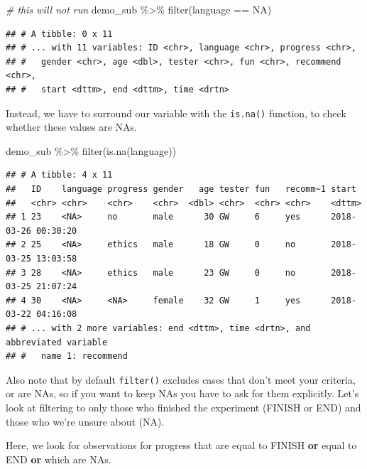 \documentclass[
]{book}
\newenvironment{Shaded}{\begin{snugshade}}{\end{snugshade}}
\newcommand{\CommentTok}[1]{\textcolor[rgb]{0.56,0.35,0.01}{\textit{#1}}}
\newcommand{\ConstantTok}[1]{\textcolor[rgb]{0.00,0.00,0.00}{#1}}
\newcommand{\FunctionTok}[1]{\textcolor[rgb]{0.00,0.00,0.00}{#1}}
\newcommand{\NormalTok}[1]{#1}
\newcommand{\SpecialCharTok}[1]{\textcolor[rgb]{0.00,0.00,0.00}{#1}}
\begin{document}
\begin{Shaded}
\begin{Highlighting}[]
\CommentTok{\# this will not run}
\NormalTok{demo\_sub }\SpecialCharTok{\%\textgreater{}\%} \FunctionTok{filter}\NormalTok{(language }\SpecialCharTok{==} \ConstantTok{NA}\NormalTok{)}
\end{Highlighting}
\end{Shaded}

\begin{verbatim}
## # A tibble: 0 x 11
## # ... with 11 variables: ID <chr>, language <chr>, progress <chr>,
## #   gender <chr>, age <dbl>, tester <chr>, fun <chr>, recommend <chr>,
## #   start <dttm>, end <dttm>, time <drtn>
\end{verbatim}

Instead, we have to surround our variable with the \texttt{is.na()} function, to check whether these values are NAs.

\begin{Shaded}
\begin{Highlighting}[]
\NormalTok{demo\_sub }\SpecialCharTok{\%\textgreater{}\%} \FunctionTok{filter}\NormalTok{(}\FunctionTok{is.na}\NormalTok{(language))}
\end{Highlighting}
\end{Shaded}

\begin{verbatim}
## # A tibble: 4 x 11
##   ID    language progress gender   age tester fun   recomm~1 start              
##   <chr> <chr>    <chr>    <chr>  <dbl> <chr>  <chr> <chr>    <dttm>             
## 1 23    <NA>     no       male      30 GW     6     yes      2018-03-26 00:30:20
## 2 25    <NA>     ethics   male      18 GW     0     no       2018-03-25 13:03:58
## 3 28    <NA>     ethics   male      23 GW     0     no       2018-03-25 21:07:24
## 4 30    <NA>     <NA>     female    32 GW     1     yes      2018-03-22 04:16:08
## # ... with 2 more variables: end <dttm>, time <drtn>, and abbreviated variable
## #   name 1: recommend
\end{verbatim}

Also note that by default \texttt{filter()} excludes cases that don't meet your criteria, or are NAs, so if you want to keep NAs you have to ask for them explicitly. Let's look at filtering to only those who finished the experiment (FINISH or END) and those who we're unsure about (NA).

Here, we look for observations for progress that are equal to FINISH \textbf{or} equal to END \textbf{or} which are NAs.
\end{document}
